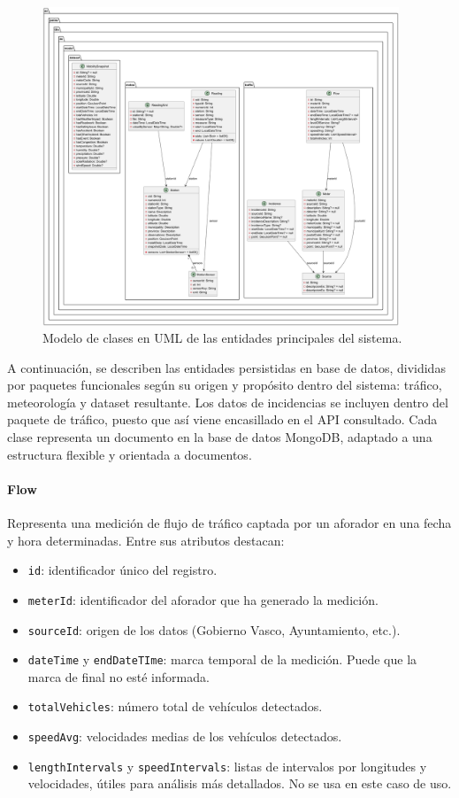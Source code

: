 \begin{figure}[H]
	\centering
	\includegraphics[width=0.95\textwidth]{includes/model_classes.png}
	\caption{Modelo de clases en UML de las entidades principales del sistema.}
	\label{fig:uml_classes}
\end{figure}

A continuación, se describen las entidades persistidas en base de datos, divididas por paquetes funcionales según su origen y propósito dentro del sistema: tráfico, meteorología y dataset resultante. Los datos de incidencias se incluyen dentro del paquete de tráfico, puesto que así viene encasillado en el API consultado. Cada clase representa un documento en la base de datos MongoDB, adaptado a una estructura flexible y orientada a documentos.

\paragraph{Flow}
Representa una medición de flujo de tráfico captada por un aforador en una fecha y hora determinadas. Entre sus atributos destacan:
\begin{itemize}
	\item \texttt{id}: identificador único del registro.
	\item \texttt{meterId}: identificador del aforador que ha generado la medición.
	\item \texttt{sourceId}: origen de los datos (Gobierno Vasco, Ayuntamiento, etc.).
	\item \texttt{dateTime} y \texttt{endDateTIme}: marca temporal de la medición. Puede que la marca de final no esté informada.
	\item \texttt{totalVehicles}: número total de vehículos detectados.
	\item \texttt{speedAvg}: velocidades medias de los vehículos detectados.
	\item \texttt{lengthIntervals} y \texttt{speedIntervals}: listas de intervalos por longitudes y velocidades, útiles para análisis más detallados. No se usa en este caso de uso.
\end{itemize}

